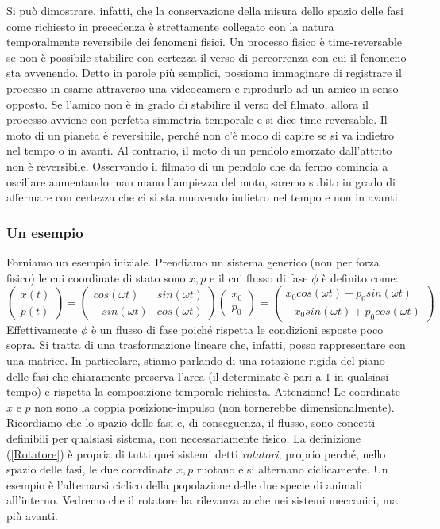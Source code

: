 \documentclass[a4paper,openany]{article}
\begin{document}
	
	Si può dimostrare, infatti, che la conservazione della misura dello spazio delle fasi come richiesto in precedenza è strettamente collegato con la natura temporalmente reversibile dei fenomeni fisici. Un processo fisico è time-reversable se non è possibile stabilire con certezza il verso di percorrenza con cui il fenomeno sta avvenendo. Detto in parole più semplici, possiamo immaginare di registrare il processo in esame attraverso una videocamera e riprodurlo ad un amico in senso opposto. Se l'amico non è in grado di stabilire il verso del filmato, allora il processo avviene con perfetta simmetria temporale e si dice time-reversable. Il moto di un pianeta è reversibile, perché non c'è modo di capire se si va indietro nel tempo o in avanti. Al contrario, il moto di un pendolo smorzato dall'attrito non è reversibile. Osservando il filmato di un pendolo che da fermo comincia a oscillare aumentando man mano l'ampiezza del moto, saremo subito in grado di affermare con certezza che ci si sta muovendo indietro nel tempo e non in avanti.
	\subsubsection{Un esempio}
	Forniamo un esempio iniziale. Prendiamo un sistema generico (non per forza fisico) le cui coordinate di stato sono $x,p$ e il cui flusso di fase $\phi$ è definito come:
	\begin{equation}
		\begin{pmatrix}
			x(t) \\ p(t)
		\end{pmatrix}
		= 
		\begin{pmatrix}
			cos(\omega t) & sin(\omega t)\\
			-sin(\omega t) & cos(\omega t)
		\end{pmatrix}
		\begin{pmatrix}
			x_{0} \\ p_{0}
		\end{pmatrix}
		=
		\begin{pmatrix}
			x_{0}cos(\omega t) + p_{0}sin(\omega t) \\
			-x_{0}sin(\omega t) + p_{0}cos(\omega t)
		\end{pmatrix}
		\label{Rotatore}
	\end{equation}
	Effettivamente $\phi$ è un flusso di fase poiché rispetta le condizioni esposte poco sopra. Si tratta di una trasformazione lineare che, infatti, posso rappresentare con una matrice. In particolare, stiamo parlando di una rotazione rigida del piano delle fasi che chiaramente preserva l'area (il determinate è pari a $1$ in qualsiasi tempo) e rispetta la composizione temporale richiesta. Attenzione! Le coordinate $x \mbox{ e } p$ non sono la coppia posizione-impulso (non tornerebbe dimensionalmente). Ricordiamo che lo spazio delle fasi e, di conseguenza, il flusso, sono concetti definibili per qualsiasi sistema, non necessariamente fisico. La definizione (\ref{Rotatore}) è propria di tutti quei sistemi detti \textit{rotatori}, proprio perché, nello spazio delle fasi, le due coordinate $x,p$ ruotano e si alternano ciclicamente. Un esempio è l'alternarsi ciclico della popolazione delle due specie di animali all'interno. Vedremo che il rotatore ha rilevanza anche nei sistemi meccanici, ma più avanti. 
\end{document}
